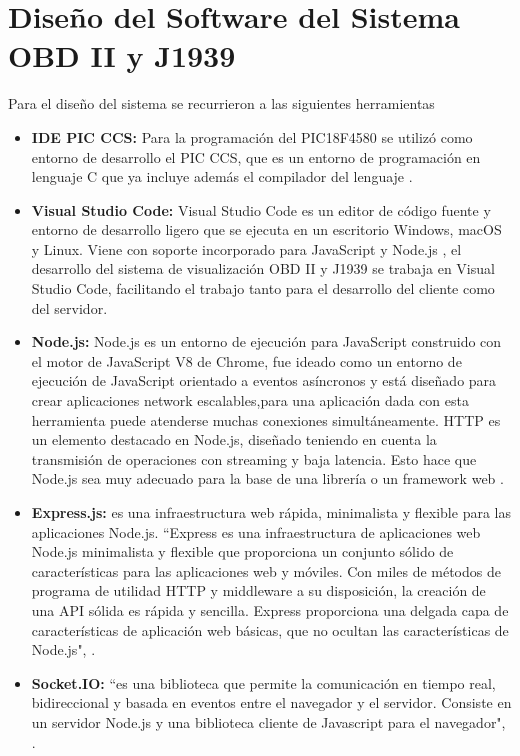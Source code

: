 \section {Diseño del Software del Sistema OBD II y J1939}
Para el diseño del sistema se recurrieron a las siguientes herramientas 
\begin{itemize}
    \item \textbf{IDE PIC CCS: } Para la programación del PIC18F4580 se utilizó como entorno de desarrollo el PIC CCS, que es un entorno de programación en lenguaje C que ya incluye además el compilador del lenguaje \cite{ccs}. 
    
    \item \textbf{Visual Studio Code:} Visual Studio Code es un editor de código fuente y entorno de desarrollo ligero que se ejecuta en un escritorio Windows, macOS y Linux. Viene con soporte incorporado para JavaScript y  Node.js \cite{vsc}, el desarrollo del sistema de visualización OBD II y J1939 se trabaja en Visual Studio Code, facilitando el trabajo tanto para el desarrollo del cliente como del servidor. 
	\item {\bfseries Node.js: }	Node.js es un entorno de ejecución para JavaScript construido con el motor de JavaScript V8 de Chrome, fue ideado como un entorno de ejecución de JavaScript orientado a eventos asíncronos y está diseñado para crear aplicaciones network escalables,para una aplicación dada con esta herramienta puede atenderse muchas conexiones simultáneamente.
	HTTP es un elemento destacado en Node.js, diseñado teniendo en cuenta la transmisión de operaciones con streaming y baja latencia. Esto hace que Node.js sea muy adecuado para la base de una librería o un framework web \cite{nodejs}.
	\item {\bfseries Express.js: } es una infraestructura web rápida, minimalista y flexible para las aplicaciones Node.js. ``Express es una infraestructura de aplicaciones web Node.js minimalista y flexible que proporciona un conjunto sólido de características para las aplicaciones web y móviles. 	Con miles de métodos de programa de utilidad HTTP y middleware a su disposición, la creación de una API sólida es rápida y sencilla. Express proporciona una delgada capa de características de aplicación web básicas, que no ocultan las características de Node.js",  \cite{express}. %
	\item {\bfseries Socket.IO: } ``es una biblioteca que permite la comunicación en tiempo real, bidireccional y basada en eventos entre el navegador y el servidor. Consiste en  un servidor Node.js y una biblioteca cliente de Javascript para el navegador", \cite{socket}. %

\end{itemize}
